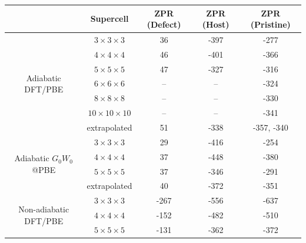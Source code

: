 \documentclass[journal=jctcce,manuscript=article]{achemso}
\begin{document}

\begin{table}[]
    \centering
    \begin{threeparttable}
    \begin{tabular}{ccccc}
    \hline\hline
    & Supercell           & ZPR (Defect)  & ZPR (Host) & ZPR (Pristine) \\
    \hline
    \multirow{7}{*}{Adiabatic DFT/PBE} & $3\times 3\times 3$                 & 36       & -397                    & -277 \\
    & $4\times 4\times 4$                 & 46 & -401                           & -366 \\
    & $5\times 5\times 5$                 & 47 & -327                           & -316 \\
    & $6\times 6\times 6$  & --                  & -- & -324 \\
    & $8\times 8\times 8$ & --                  & -- & -330 \\
    & $10\times 10\times 10$  & --               & -- & -341 \\
    & extrapolated  & 51\tnote{a} & -338\tnote{a} & -357\tnote{a}, -340\tnote{b} \\
    \hline
    \multirow{4}{*}{Adiabatic $G_0W_0$@PBE}& $3\times 3\times 3$                 & 29  & -416                          & -254 \\
    & $4\times 4\times 4$                 & 37 & -448                          & -380 \\
    & $5\times 5\times 5$              & 37 & -346                            & -291 \\
    & extrapolated   & 40\tnote{a} & -372\tnote{a} & -351\tnote{a} \\
    \hline
    \multirow{7}{*}{Non-adiabatic DFT/PBE} & $3\times 3\times 3$                &    -267  & -556                       & -637  \\
    & $4\times 4\times 4$                & -152 &  -482                         & -510 \\
    & $5\times 5\times 5$                 & -131 & -362                          &  -372 \\

\end{tabular}
\end{threeparttable}
\end{table}
\end{document}
